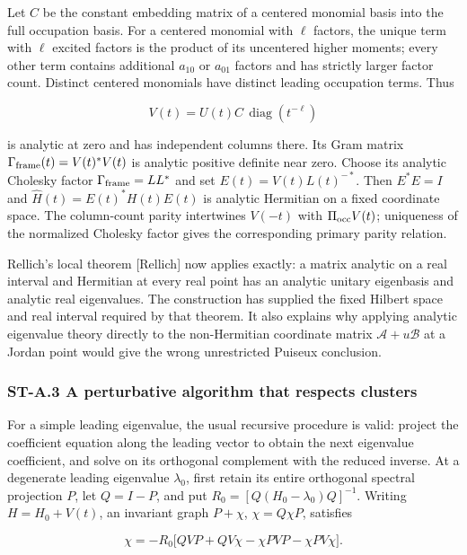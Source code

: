 Let \(C\) be the constant embedding matrix of a centered monomial basis into the full occupation basis. For a centered monomial with \(\ell\) factors, the unique term with \(\ell\) excited factors is the product of its uncentered higher moments; every other term contains additional \(a_{10}\) or \(a_{01}\) factors and has strictly larger factor count. Distinct centered monomials have distinct leading occupation terms. Thus

\[
V(t)=U(t)C\,\operatorname{diag}(t^{-\ell})
\]

is analytic at zero and has independent columns there. Its Gram matrix \(\Gamma_{\rm frame}(t)=V(t)^*V(t)\) is analytic positive definite near zero. Choose its analytic Cholesky factor \(\Gamma_{\rm frame}=LL^*\) and set \(E(t)=V(t)L(t)^{-*}\). Then \(E^*E=I\) and \(\widehat H(t)=E(t)^*H(t)E(t)\) is analytic Hermitian on a fixed coordinate space. The column-count parity intertwines \(V(-t)\) with \(\Pi_{\rm occ}V(t)\); uniqueness of the normalized Cholesky factor gives the corresponding primary parity relation.

Rellich's local theorem {[}Rellich{]} now applies exactly: a matrix analytic on a real interval and Hermitian at every real point has an analytic unitary eigenbasis and analytic real eigenvalues. The construction has supplied the fixed Hilbert space and real interval required by that theorem. It also explains why applying analytic eigenvalue theory directly to the non-Hermitian coordinate matrix \(\mathscr A+u\mathscr B\) at a Jordan point would give the wrong unrestricted Puiseux conclusion.

\hypertarget{st-a.3-a-perturbative-algorithm-that-respects-clusters}{%
\subsubsection{ST-A.3 A perturbative algorithm that respects clusters}\label{st-a.3-a-perturbative-algorithm-that-respects-clusters}}

For a simple leading eigenvalue, the usual recursive procedure is valid: project the coefficient equation along the leading vector to obtain the next eigenvalue coefficient, and solve on its orthogonal complement with the reduced inverse. At a degenerate leading eigenvalue \(\lambda_0\), first retain its entire orthogonal spectral projection \(P\), let \(Q=I-P\), and put \(R_0=[Q(H_0-\lambda_0)Q]^{-1}\). Writing \(H=H_0+V(t)\), an invariant graph \(P+\chi\), \(\chi=Q\chi P\), satisfies

\[
\chi=-R_0\big[
QVP+QV\chi-\chi PVP-\chi PV\chi
\big].
\]


